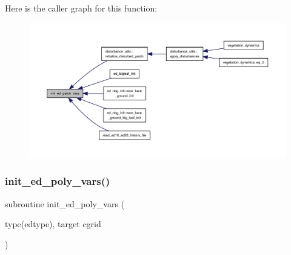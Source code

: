 Here is the caller graph for this function\+:
\nopagebreak
\begin{figure}[H]
\begin{center}
\leavevmode
\includegraphics[width=350pt]{ed__type__init_8f90_ad4cd2d9291dc969b63d1592d0f2a3164_icgraph}
\end{center}
\end{figure}
\mbox{\label{ed__type__init_8f90_a67afe21be4346c13ced583c229e2bb4c}} 
\subsubsection{\texorpdfstring{init\+\_\+ed\+\_\+poly\+\_\+vars()}{init\_ed\_poly\_vars()}}
{\footnotesize\ttfamily subroutine init\+\_\+ed\+\_\+poly\+\_\+vars (\begin{DoxyParamCaption}\item[{type(edtype), target}]{cgrid }\end{DoxyParamCaption})}


